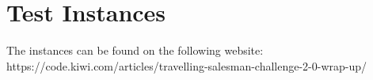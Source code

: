 \chapter{Test Instances}
\label{AppendixB}

The instances can be found on the following website: https://code.kiwi.com/articles/travelling-salesman-challenge-2-0-wrap-up/